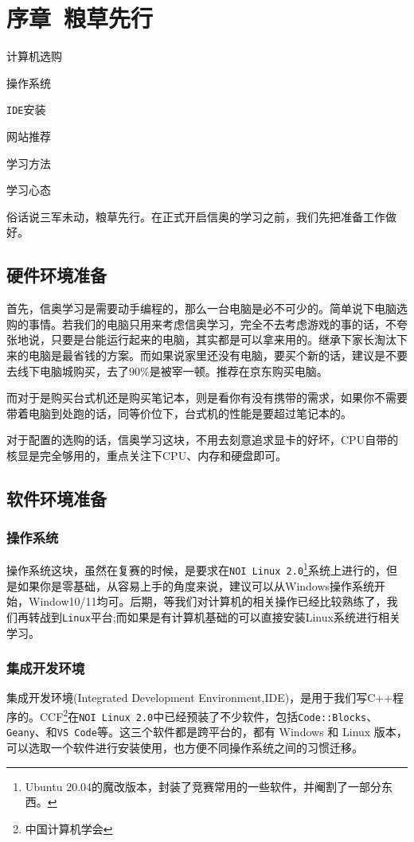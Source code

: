 \chapter*{序章\ 粮草先行}
\begin{introduction}
	\item 计算机选购
	\item 操作系统
	\item \texttt{IDE}安装
	\item 网站推荐
	\item 学习方法
	\item 学习心态
\end{introduction}

俗话说三军未动，粮草先行。在正式开启信奥的学习之前，我们先把准备工作做好。
\section{硬件环境准备}
首先，信奥学习是需要动手编程的，那么一台电脑是必不可少的。简单说下电脑选购的事情。若我们的电脑只用来考虑信奥学习，完全不去考虑游戏的事的话，不夸张地说，只要是台能运行起来的电脑，其实都是可以拿来用的。继承下家长淘汰下来的电脑是最省钱的方案。而如果说家里还没有电脑，要买个新的话，建议是不要去线下电脑城购买，去了$ 90\% $是被宰一顿。推荐在京东购买电脑。

而对于是购买台式机还是购买笔记本，则是看你有没有携带的需求，如果你不需要带着电脑到处跑的话，同等价位下，台式机的性能是要超过笔记本的。

对于配置的选购的话，信奥学习这块，不用去刻意追求显卡的好坏，CPU自带的核显是完全够用的，重点关注下CPU、内存和硬盘即可。
\section{软件环境准备}
\subsection{操作系统}
操作系统这块，虽然在复赛的时候，是要求在\texttt{NOI Linux 2.0}\footnote{Ubuntu 20.04的魔改版本，封装了竞赛常用的一些软件，并阉割了一部分东西。}系统上进行的，但是如果你是零基础，从容易上手的角度来说，建议可以从Windows操作系统开始，Window10/11均可。后期，等我们对计算机的相关操作已经比较熟练了，我们再转战到\texttt{Linux}平台;而如果是有计算机基础的可以直接安装Linux系统进行相关学习。
\subsection{集成开发环境}
集成开发环境(Integrated Development Environment,IDE)，是用于我们写C++程序的。CCF\footnote{中国计算机学会}在\texttt{NOI Linux 2.0}中已经预装了不少软件，包括\texttt{Code::Blocks}、\texttt{Geany}、和\texttt{VS Code}等。这三个软件都是跨平台的，都有 Windows 和 Linux 版本，可以选取一个软件进行安装使用，也方便不同操作系统之间的习惯迁移。

